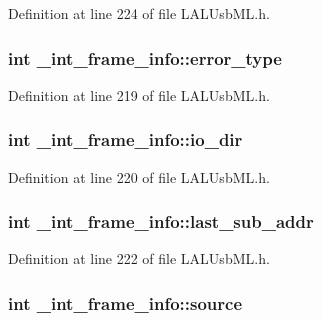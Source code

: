 Definition at line 224 of file LALUsbML.h.\hypertarget{struct__int__frame__info_a1bec0ff5f853c91d7c1f942a313b3f04}{
\subsubsection[{error\_\-type}]{\setlength{\rightskip}{0pt plus 5cm}int {\bf \_\-int\_\-frame\_\-info::error\_\-type}}}
\label{struct__int__frame__info_a1bec0ff5f853c91d7c1f942a313b3f04}


Definition at line 219 of file LALUsbML.h.\hypertarget{struct__int__frame__info_a25159adc4e751e8a9bb755171b256545}{
\subsubsection[{io\_\-dir}]{\setlength{\rightskip}{0pt plus 5cm}int {\bf \_\-int\_\-frame\_\-info::io\_\-dir}}}
\label{struct__int__frame__info_a25159adc4e751e8a9bb755171b256545}


Definition at line 220 of file LALUsbML.h.\hypertarget{struct__int__frame__info_a939d145888f1c2264e2e980c07412efb}{
\subsubsection[{last\_\-sub\_\-addr}]{\setlength{\rightskip}{0pt plus 5cm}int {\bf \_\-int\_\-frame\_\-info::last\_\-sub\_\-addr}}}
\label{struct__int__frame__info_a939d145888f1c2264e2e980c07412efb}


Definition at line 222 of file LALUsbML.h.\hypertarget{struct__int__frame__info_aa1ce450da20558e8f163ad2fe94549a0}{
\subsubsection[{source}]{\setlength{\rightskip}{0pt plus 5cm}int {\bf \_\-int\_\-frame\_\-info::source}}}
\label{struct__int__frame__info_aa1ce450da20558e8f163ad2fe94549a0}


